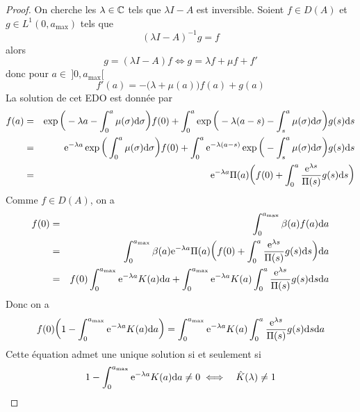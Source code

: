 \begin{proof}
    On cherche les $\lambda \in \mathbb{C}$ tels que $\lambda I- A$ est inversible. Soient $f \in D(A)$ et $g \in L^1(0,a_{\max})$ tels que 
    \begin{equation*}
        (\lambda I - A)^{-1}g=f
    \end{equation*}
    alors 
    \begin{equation*}
        g = (\lambda I - A)f \iff g = \lambda f + \mu f + f'
    \end{equation*}
    donc pour $a \in \ ]0,a_{\max}[$
    \begin{equation*}
        f'(a) = -\big(\lambda +\mu(a)\big)f(a)+g(a)
    \end{equation*}
    La solution de cet EDO est donnée par 
    \begin{eqnarray*}
        f(a) &=& \exp\bigg(-\lambda a - \int_0^a\mu(\sigma)\mathrm{d} \sigma\bigg)f(0)+\int_0^a \exp\bigg(-\lambda(a-s)-\int_s^a \mu(\sigma)\mathrm{d} \sigma\bigg)g(s)\mathrm{d} s \\
        &=& \mathrm{e}^{-\lambda a}\exp\bigg(\int_0^a \mu(\sigma)\mathrm{d} \sigma\bigg)f(0) + \int_0^a \mathrm{e}^{-\lambda(a-s)}\exp\bigg(-\int_s^a\mu(\sigma)\mathrm{d} \sigma\bigg)g(s)\mathrm{d} s \\
        &=& \mathrm{e}^{-\lambda a}\Pi(a)\bigg(f(0)+\int_0^a \frac{\mathrm{e}^{\lambda s}}{\Pi(s)}g(s)\mathrm{d} s \bigg)
    \end{eqnarray*}
    Comme $f \in D(A)$, on a 
    \begin{eqnarray*}
        f(0) &=& \int_0^{a_{\max}}\beta(a)f(a)\mathrm{d} a \\
        &=& \int_0^{a_{\max}} \beta(a) \mathrm{e}^{-\lambda a}\Pi(a)\bigg(f(0)+\int_0^a \frac{\mathrm{e}^{\lambda s}}{\Pi(s)}g(s)\mathrm{d} s \bigg)\mathrm{d} a \\
        &=& f(0)\int_0^{a_{\max}}\mathrm{e}^{-\lambda a}K(a)\mathrm{d} a + \int_0^{a_{\max}} \mathrm{e}^{-\lambda a}K(a)\int_0^a \frac{\mathrm{e}^{\lambda s}}{\Pi(s)}g(s)\mathrm{d} s\mathrm{d} a
    \end{eqnarray*}
    Donc on a 
    \begin{equation*}
        f(0)\bigg(1-\int_0^{a_{\max}}\mathrm{e}^{-\lambda a}K(a)\mathrm{d} a\bigg) = \int_0^{a_{\max}} \mathrm{e}^{-\lambda a}K(a)\int_0^a \frac{\mathrm{e}^{\lambda s}}{\Pi(s)}g(s)\mathrm{d} s\mathrm{d} a
    \end{equation*}
    Cette équation admet une unique solution si et seulement si 
    \begin{eqnarray*}
        1-\int_0^{a_{\max}}\mathrm{e}^{-\lambda a}K(a)\mathrm{d} a \neq 0 &\iff& \hat{K}(\lambda) \neq 1
    \end{eqnarray*}

\end{proof}
